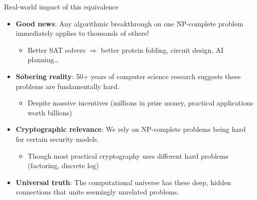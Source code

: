 \documentclass[aspectratio=169, lualatex, handout]{beamer}
\begin{document}
\begin{frame}{Real-world impact of this equivalence}
	\begin{itemize}[<+->]
		\item \textbf{Good news}: Any algorithmic breakthrough on one NP-complete problem immediately applies to thousands of others!
		      \begin{itemize}
			      \item Better SAT solvers $\Rightarrow$ better protein folding, circuit design, AI planning\ldots
		      \end{itemize}
		\item \textbf{Sobering reality}: 50+ years of computer science research suggests these problems are fundamentally hard.
		      \begin{itemize}
			      \item Despite massive incentives (millions in prize money, practical applications worth billions)
		      \end{itemize}
		\item \textbf{Cryptographic relevance}: We rely on NP-complete problems being hard for certain security models.
		      \begin{itemize}
			      \item Though most practical cryptography uses different hard problems (factoring, discrete log)
		      \end{itemize}
		\item \textbf{Universal truth}: The computational universe has these deep, hidden connections that unite seemingly unrelated problems.
	\end{itemize}
\end{frame}
\end{document}

